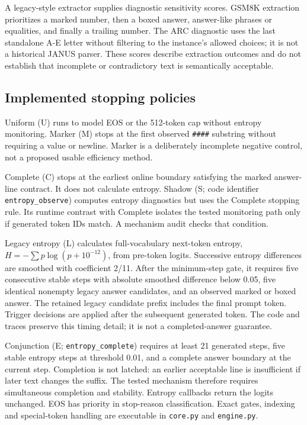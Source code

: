\documentclass[12pt,a4paper]{article}
\begin{document}
A legacy-style extractor supplies diagnostic sensitivity scores. GSM8K extraction prioritizes a marked number, then a boxed answer, answer-like phrases or equalities, and finally a trailing number. The ARC diagnostic uses the last standalone A-E letter without filtering to the instance's allowed choices; it is not a historical JANUS parser. These scores describe extraction outcomes and do not establish that incomplete or contradictory text is semantically acceptable.

\subsection{Implemented stopping policies}
Uniform (U) runs to model EOS or the 512-token cap without entropy monitoring. Marker (M) stops at the first observed \texttt{\#\#\#\#} substring without requiring a value or newline. Marker is a deliberately incomplete negative control, not a proposed usable efficiency method.

Complete (C) stops at the earliest online boundary satisfying the marked answer-line contract. It does not calculate entropy. Shadow (S; code identifier \texttt{entropy\_observe}) computes entropy diagnostics but uses the Complete stopping rule. Its runtime contrast with Complete isolates the tested monitoring path only if generated token IDs match. A mechanism audit checks that condition.

Legacy entropy (L) calculates full-vocabulary next-token entropy, $H=-\sum p\log(p+10^{-12})$, from pre-token logits. Successive entropy differences are smoothed with coefficient 2/11. After the minimum-step gate, it requires five consecutive stable steps with absolute smoothed difference below 0.05, five identical nonempty legacy answer candidates, and an observed marked or boxed answer. The retained legacy candidate prefix includes the final prompt token. Trigger decisions are applied after the subsequent generated token. The code and traces preserve this timing detail; it is not a completed-answer guarantee.

Conjunction (E; \texttt{entropy\_complete}) requires at least 21 generated steps, five stable entropy steps at threshold 0.01, and a complete answer boundary at the current step. Completion is not latched: an earlier acceptable line is insufficient if later text changes the suffix. The tested mechanism therefore requires simultaneous completion and stability. Entropy callbacks return the logits unchanged. EOS has priority in stop-reason classification. Exact gates, indexing and special-token handling are executable in \texttt{core.py} and \texttt{engine.py}.
\end{document}
